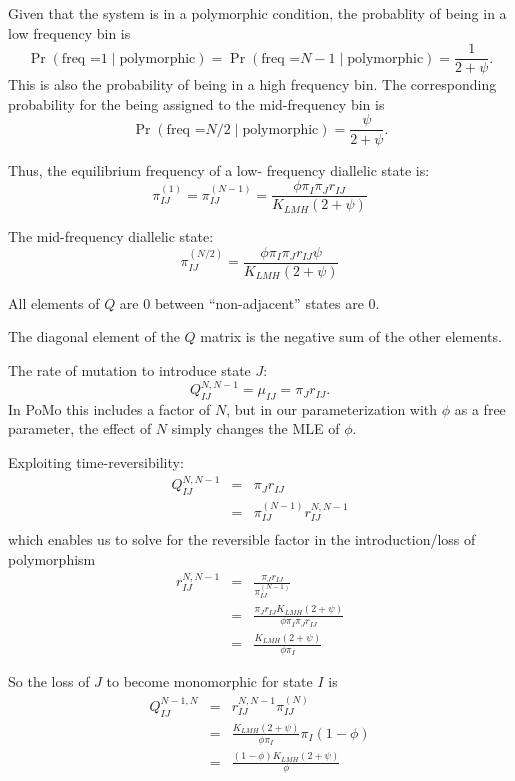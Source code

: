 \documentclass{llncs}
\newcommand{\polyProb}{\ensuremath{\phi}}}
\newcommand{\Klmh}{\ensuremath{K_{LMH}}}}
\begin{document}
Given that the system is in a polymorphic condition, the probablity of being in a low frequency bin is 
    $$\Pr(\mbox{freq =} 1 \mid \mbox{polymorphic}) = \Pr(\mbox{freq =} N -1 \mid \mbox{polymorphic}) = \frac{1}{2 + \psi}.$$
This is also the probability of being in a high frequency bin.
The corresponding probability for the being assigned to the mid-frequency bin is 
$$\Pr(\mbox{freq =} N/2 \mid \mbox{polymorphic}) =  \frac{\psi}{2 + \psi}.$$

Thus, the equilibrium frequency of a low- frequency diallelic state is: 
\begin{equation}
    \pi_{IJ}^{(1)} = \pi_{IJ}^{(N-1)}  =  \frac{\polyProb\pi_I\pi_J r_{IJ}}{\Klmh (2 + \psi)}
\end{equation}

The mid-frequency diallelic state: 
\begin{equation}
    \pi_{IJ}^{(N/2)} = \frac{\polyProb\pi_I\pi_J r_{IJ}\psi}{\Klmh (2 + \psi)} 
\end{equation}


All elements of $Q$ are 0 between ``non-adjacent'' states are 0.

The diagonal element of the $Q$ matrix is the negative sum of the other elements.

The rate of mutation to introduce state $J$:
\begin{equation}
   Q_{IJ}^{N,N-1} = \mu_{IJ} = \pi_J r_{IJ}.
\end{equation}
In PoMo this includes a factor of $N$, but in our parameterization with $\phi$ as a free parameter, the effect of $N$ simply changes the MLE of $\phi$.

Exploiting time-reversibility:
\begin{eqnarray}
    Q_{IJ}^{N,N-1} & = & \pi_J r_{IJ} \nonumber\\
    & = & \pi_{IJ}^{(N-1)} r_{IJ}^{N, N-1} \nonumber\\
\end{eqnarray}
which enables us to solve for the reversible factor in the introduction/loss of polymorphism
\begin{eqnarray}
  r_{IJ}^{N, N-1} & = & \frac{\pi_J r_{IJ}}{ \pi_{IJ}^{(N-1)}} \nonumber\\
  & = & \frac{\pi_J r_{IJ}\Klmh (2 + \psi)}{ \polyProb\pi_I\pi_J r_{IJ}} \nonumber \\
  & = & \frac{\Klmh (2 + \psi)}{ \polyProb\pi_I}
\end{eqnarray}

So the loss of  $J$ to become monomorphic for state $I$ is
\begin{eqnarray}
   Q_{IJ}^{N-1,N} & = & r_{IJ}^{N, N-1} \pi_{IJ}^{(N)} \nonumber \\
    & = & \frac{\Klmh (2 + \psi)}{ \polyProb\pi_I} \pi_I (1 -\phi) \nonumber \\
    & = & \frac{(1 -\phi) \Klmh (2 + \psi)}{ \polyProb}
\end{eqnarray}
\end{document}

